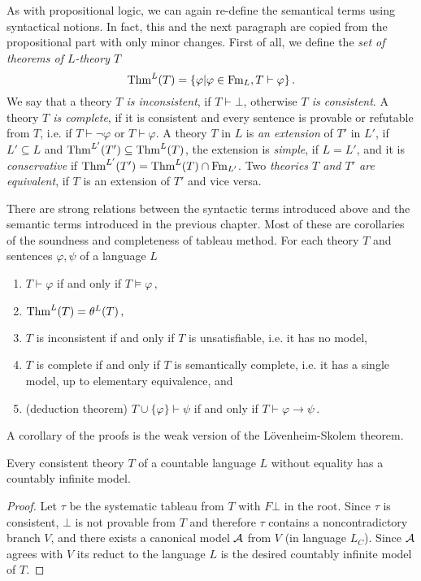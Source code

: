 As with propositional logic, we can again re-define the semantical terms using syntactical notions. In fact, this and the next paragraph are copied from the propositional part with only minor changes. First of all, we define the \emph{set of theorems of $L$-theory $T$} $$\operatorname{Thm}^L(T) = \{\varphi | \varphi \in \operatorname{Fm}_L, T \vdash \varphi\}\,.$$ We say that a theory \emph{$T$ is inconsistent}, if $T \vdash \bot$, otherwise \emph{$T$ is consistent}. A theory \emph{$T$ is complete}, if it is consistent and every sentence is provable or refutable from $T$, i.e. if $T \vdash \neg \varphi$ or $T \vdash \varphi$. A theory $T$ in $L$ is \emph{an extension} of $T'$ in $L'$, if $L' \subseteq L$ and $\operatorname{Thm}^{L'}(T') \subseteq \operatorname{Thm}^{L}(T)$, the extension is \emph{simple}, if $L = L'$, and it is \emph{conservative} if $\operatorname{Thm}^{L'}(T') = \operatorname{Thm}^{L}(T) \cap \operatorname{Fm}_{L'}$. Two \emph{theories $T$ and $T'$ are equivalent}, if $T$ is an extension of $T'$ and vice versa.

There are strong relations between the syntactic terms introduced above and the semantic terms introduced in the previous chapter. Most of these are corollaries of the soundness and completeness of tableau method. For each theory $T$ and sentences $\varphi, \psi$ of a language $L$ 
\begin{enumerate}
	\item $T \vdash \varphi$ if and only if $T \vDash \varphi\,,$
	\item $\operatorname{Thm}^L(T) = \theta^L(T)\,,$
	\item $T$ is inconsistent if and only if $T$ is unsatisfiable, i.e. it has no model,
	\item $T$ is complete if and only if $T$ is semantically complete, i.e. it has a single model, up to elementary equivalence, and
	\item (deduction theorem) $T \cup \{\varphi\} \vdash \psi$ if and only if $T \vdash \varphi \to \psi\,.$
\end{enumerate}

A corollary of the proofs is the weak version of the Lövenheim-Skolem theorem.

\begin{theorem}
Every consistent theory $T$ of a countable language $L$ without equality has a countably infinite model.
\end{theorem}
\begin{proof}
Let $\tau$ be the systematic tableau from $T$ with $F\bot$ in the root. Since $\tau$ is consistent, $\bot$ is not provable from $T$ and therefore $\tau$ contains a noncontradictory branch $V$, and there exists a canonical model $\mathcal{A}$ from $V$ (in language $L_C$). Since $\mathcal{A}$ agrees with $V$ its reduct to the language $L$ is the desired countably infinite model of $T$.
\end{proof}

